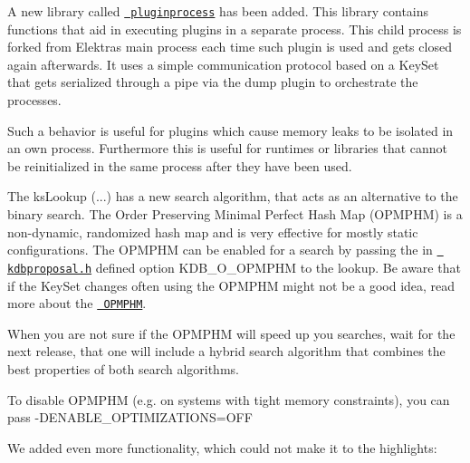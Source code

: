 A new library called \href{https://github.com/ElektraInitiative/libelektra/tree/master/src/libs/pluginprocess}{\texttt{ pluginprocess}} has been added. This library contains functions that aid in executing plugins in a separate process. This child process is forked from Elektra\textquotesingle{}s main process each time such plugin is used and gets closed again afterwards. It uses a simple communication protocol based on a Key\+Set that gets serialized through a pipe via the {\ttfamily dump} plugin to orchestrate the processes.

Such a behavior is useful for plugins which cause memory leaks to be isolated in an own process. Furthermore this is useful for runtimes or libraries that cannot be reinitialized in the same process after they have been used.

The {\ttfamily ks\+Lookup (...)} has a new search algorithm, that acts as an alternative to the binary search. The Order Preserving Minimal Perfect Hash Map (O\+P\+M\+P\+HM) is a non-\/dynamic, randomized hash map and is very effective for mostly static configurations. The O\+P\+M\+P\+HM can be enabled for a search by passing the in \href{https://github.com/ElektraInitiative/libelektra/blob/master/src/include/kdbproposal.h}{\texttt{ kdbproposal.\+h}} defined option {\ttfamily K\+D\+B\+\_\+\+O\+\_\+\+O\+P\+M\+P\+HM} to the lookup. Be aware that if the Key\+Set changes often using the O\+P\+M\+P\+HM might not be a good idea, read more about the \href{https://github.com/ElektraInitiative/libelektra/blob/master/doc/dev/data-structures.md\#order-preserving-minimal-perfect-hash-map-aka-opmphm}{\texttt{ O\+P\+M\+P\+HM}}.

When you are not sure if the O\+P\+M\+P\+HM will speed up you searches, wait for the next release, that one will include a hybrid search algorithm that combines the best properties of both search algorithms.

To disable O\+P\+M\+P\+HM (e.\+g. on systems with tight memory constraints), you can pass {\ttfamily -\/D\+E\+N\+A\+B\+L\+E\+\_\+\+O\+P\+T\+I\+M\+I\+Z\+A\+T\+I\+O\+NS=O\+FF}

We added even more functionality, which could not make it to the highlights\+:



